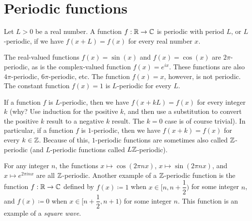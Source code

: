 \section{Periodic functions}\label{sec:5.1}

\begin{defn}\label{5.1.1}
  Let \(L > 0\) be a real number.
  A function \(f : \mathbb{R} \to \mathbb{C}\) is periodic with period \(L\), or \(L\)-periodic, if we have \(f(x + L) = f(x)\) for every real number \(x\).
\end{defn}

\begin{eg}\label{5.1.2}
  The real-valued functions \(f(x) = \sin(x)\) and \(f(x) = \cos(x)\) are \(2\pi\)-periodic, as is the complex-valued function \(f(x) = e^{i x}\).
  These functions are also \(4\pi\)-periodic, \(6\pi\)-periodic, etc.
  The function \(f(x) = x\), however, is not periodic.
  The constant function \(f(x) = 1\) is \(L\)-periodic for every \(L\).
\end{eg}

\begin{rmk}\label{5.1.3}
  If a function \(f\) is \(L\)-periodic, then we have \(f(x + kL) = f(x)\) for every integer \(k\)
  (why? Use induction for the positive \(k\), and then use a substitution to convert the positive \(k\) result to a negative \(k\) result.
  The \(k = 0\) case is of course trivial).
  In particular, if a function \(f\) is \(1\)-periodic, then we have \(f(x + k) = f(x)\) for every \(k \in \mathbb{Z}\).
  Because of this, \(1\)-periodic functions are sometimes also called \(\mathbb{Z}\)-periodic
  (and \(L\)-periodic functions called \(L \mathbb{Z}\)-periodic).
\end{rmk}

\begin{eg}\label{5.1.4}
  For any integer \(n\), the functions \(x \mapsto \cos(2 \pi n x)\), \(x \mapsto \sin(2 \pi n x)\), and \(x \mapsto e^{2 \pi i n x}\) are all \(\mathbb{Z}\)-periodic.
  Another example of a \(\mathbb{Z}\)-periodic function is the function \(f : \mathbb{R} \to \mathbb{C}\) defined by \(f(x) \coloneqq 1\) when \(x \in [n, n + \dfrac{1}{2})\) for some integer \(n\), and \(f(x) \coloneqq 0\) when \(x \in [n + \dfrac{1}{2}, n + 1)\) for some integer \(n\).
  This function is an example of a \emph{square wave}.
\end{eg}

